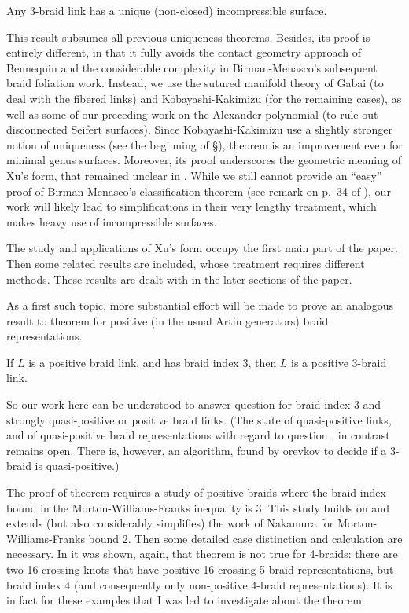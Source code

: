 \begin{theorem}\label{thuq}
Any 3-braid link has a unique (non-closed) incompressible surface.
\end{theorem}

This result subsumes all previous uniqueness theorems. Besides,
its proof is entirely different, in that it fully avoids the contact
geometry approach of Bennequin and the considerable complexity
in Birman-Menasco's subsequent braid foliation work. Instead,
we use the sutured manifold theory of Gabai \cite{Gabai,Gabai2}
(to deal with the fibered links) and Kobayashi-Kakimizu \cite{%
Kobayashi,Kakimizu} (for the remaining cases), as well as some
of our preceding work on the Alexander polynomial (to rule out
disconnected Seifert surfaces). Since Kobayashi-Kakimizu use
a slightly stronger notion of uniqueness (see the beginning of
\S{}), theorem  is an improvement even
for minimal genus surfaces. Moreover, its proof underscores the
geometric meaning of Xu's form, that remained unclear in \cite{BirMen}.
While we still cannot provide an ``easy'' proof of Birman-Menasco's
classification theorem (see remark on p.~34 of \cite{BirMen}), our
work will likely lead to simplifications in their very lengthy
treatment, which makes heavy use of incompressible surfaces.

The study and applications of Xu's form occupy the first main
part of the paper. Then some related results are included,
whose treatment requires different methods. These
results are dealt with in the later sections of the paper.

As a first such topic, more substantial effort will be made to
prove an analogous result to theorem  for
positive (in the usual Artin generators) braid representations.

\begin{theorem}\label{thg}
If $L$ is a positive braid link, and has braid index 3, then 
$L$ is a positive 3-braid link.
\end{theorem}

So our work here can be understood to answer question
 for braid index 3 and strongly quasi-positive
or positive braid links. (The state of quasi-positive links,
and of quasi-positive braid representations with regard to 
question , in contrast remains open. There is,
however, an algorithm, found by orevkov \cite{Orevkov}
to decide if a 3-braid is quasi-positive.)

The proof of theorem  requires a study of positive
braids where the braid index bound in the Morton-Williams-Franks
inequality \cite{Morton,WilFr} is 3. This study builds on and extends
(but also considerably simplifies) the work of Nakamura
\cite{Nakamura} for Morton-Williams-Franks bound 2. Then some
detailed case distinction and calculation are necessary.
In \cite{posex_bcr} it was shown, again, that theorem
 is not true for 4-braids: there are two 16 crossing
knots that have positive 16 crossing 5-braid representations,
but braid index 4 (and consequently only non-positive 4-braid
representations). It is in fact for these examples that I was
led to investigate about the theorem.

